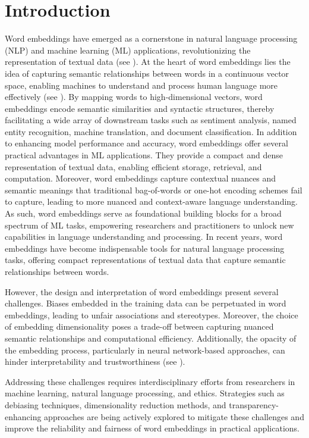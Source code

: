 \documentclass[10pt,a4paper]{elsarticle}
\begin{document}
\section{Introduction}

Word embeddings have emerged as a cornerstone in natural language processing (NLP) and machine learning (ML) applications, revolutionizing the representation of textual data (see \citep{incitti2023beyond}). At the heart of word embeddings lies the idea of capturing semantic relationships between words in a continuous vector space, enabling machines to understand and process human language more effectively (see \citep{hashimoto2016word, levy2014neural}). By mapping words to high-dimensional vectors, word embeddings encode semantic similarities and syntactic structures, thereby facilitating a wide array of downstream tasks such as sentiment analysis, named entity recognition, machine translation, and document classification. In addition to enhancing model performance and accuracy, word embeddings offer several practical advantages in ML applications. They provide a compact and dense representation of textual data, enabling efficient storage, retrieval, and computation. Moreover, word embeddings capture contextual nuances and semantic meanings that traditional bag-of-words or one-hot encoding schemes fail to capture, leading to more nuanced and context-aware language understanding. As such, word embeddings serve as foundational building blocks for a broad spectrum of ML tasks, empowering researchers and practitioners to unlock new capabilities in language understanding and processing. In recent years, word embeddings have become indispensable tools for natural language processing tasks, offering compact representations of textual data that capture semantic relationships between words. 

However, the design and interpretation of word embeddings present several challenges. Biases embedded in the training data can be perpetuated in word embeddings, leading to unfair associations and stereotypes. Moreover, the choice of embedding dimensionality poses a trade-off between capturing nuanced semantic relationships and computational efficiency. Additionally, the opacity of the embedding process, particularly in neural network-based approaches, can hinder interpretability and trustworthiness (see \citep{caliskan2022gender}).

Addressing these challenges requires interdisciplinary efforts from researchers in machine learning, natural language processing, and ethics. Strategies such as debiasing techniques, dimensionality reduction methods, and transparency-enhancing approaches are being actively explored to mitigate these challenges and improve the reliability and fairness of word embeddings in practical applications.
\end{document}
